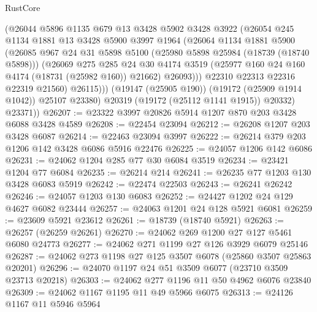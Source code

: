 \begin{lexlean}{RustCore}
\begin{coremodule}
                (@26044
                  @5896
                  @1135
                  @679
                  @13
                  @3428
                  @5902
                  @3428
                  @3922
                  (@26054
                    @245
                    @1134
                    @1881
                    @13
                    @3428
                    @5900
                    @3997
                    @1964
                    (@26064
                      @1134
                      @1881
                      @5900
                      (@26085
                        @967
                        @24
                        @31
                        @5898
                        @5100
                        (@25980 @5898 @25984 (@18739 (@18740 @5898)))
                        (@26069
                          @275
                          @285
                          @24
                          @30
                          @4174
                          @3519
                          (@25977 @160 @24 @160 @4174 (@18731 (@25982 @160)) @21662)
                          @26093)))
                    @22310
                    @22313
                    @22316
                    @22319
                    @21560)
                  @26115)))
            (@19147 (@25905 @190))
            (@19172 (@25909 @1914 @1042))
            @25107
            @23380)
          @20319
          (@19172 (@25112 @1141 @1915))
          @20332)
        @23371))
@26207 := @23322 @3997 @20826 @5914 @1207 @870 @203 @3428 @6088 @3428 @4589
@26208 := @22454 @23094
@26212 := @26208 @1207 @203 @3428 @6087
@26214 := @22463 @23094 @3997
@26222 := @26214 @379 @203 @1206 @142 @3428 @6086 @5916 @22476
@26225 := @24057 @1206 @142 @6086
@26231 := @24062 @1204 @285 @77 @30 @6084 @3519
@26234 := @23421 @1204 @77 @6084
@26235 := @26214 @214
@26241 := @26235 @77 @1203 @130 @3428 @6083 @5919
@26242 := @22474 @22503
@26243 := @26241 @26242
@26246 := @24057 @1203 @130 @6083
@26252 := @24427 @1202 @24 @129 @4627 @6082 @23444
@26257 := @24063 @1201 @24 @128 @5921 @6081
@26259 := @23609 @5921 @23612
@26261 := @18739 (@18740 @5921)
@26263 := @26257 (@26259 @26261)
@26270 := @24062 @269 @1200 @27 @127 @5461 @6080 @24773
@26277 := @24062 @271 @1199 @27 @126 @3929 @6079 @25146
@26287 := @24062 @273 @1198 @27 @125 @3507 @6078 (@25860 @3507 @25863 @20201)
@26296 := @24070 @1197 @24 @51 @3509 @6077 (@23710 @3509 @23713 @20218)
@26303 := @24062 @277 @1196 @11 @50 @4962 @6076 @23840
@26309 := @24062 @1167 @1195 @11 @49 @5966 @6075
@26313 := @24126 @1167 @11 @5946 @5964

\end{coremodule}
\end{lexlean}
